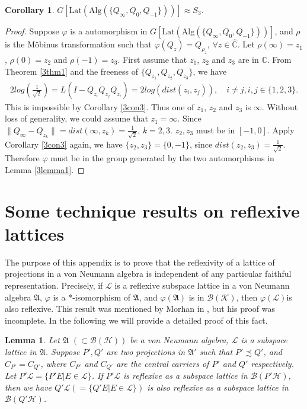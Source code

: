 \documentclass{amsart}
\newcommand{\AAA}{\mathfrak A}
\newcommand{\B}{\mathcal B}
\newcommand{\HHH}{\mathcal H} %
\newcommand{\KKK}{\mathcal K} %
\newcommand{\LLL}{\mathcal L} %
\newcommand{\Lat}{\mathrm{Lat}}
\newcommand{\Alg}{\mathrm{Alg}}
\newcommand{\C}{\mathbb C} %
\newtheorem{corollary}{Corollary}[section]
\newtheorem{lemma}{Lemma}[section]
\begin{document}
\begin{corollary}
$G[\Lat(\Alg( \{ Q_{\infty},  Q_{0}, Q_{-1} \}))] \approx S_3$.
\end{corollary}

\begin{proof}
Suppose $\varphi$ is a automorphism in $G[\Lat(\Alg( \{ Q_{\infty},  Q_{0}, Q_{-1} \}))]$, and $\rho$ is the M\"{o}binus transformation such that
$\varphi(Q_{z}) = Q_{\rho_{z}}$, $\forall z \in \widehat{\C}$. Let $\rho(\infty) = z_1$, $\rho(0) = z_2$ and $\rho(-1) = z_3$.
First assume that $z_1$, $z_2$ and $z_3$ are in $\C$. From Theorem \ref{3thm1} and the freeness of $\{Q_{z_1}, Q_{z_2}, Q_{z_3} \}$, we have 
\begin{align*}
2log(\frac{1}{\sqrt{2}}) =  L(I - Q_{z_i}Q_{z_j}Q_{z_i}) = 2log(dist(z_i, z_j)), \quad i \neq j, i, j \in \{1, 2, 3 \}.
\end{align*}
This is impossible by Corollary \ref{3con3}. Thus one of $z_1$, $z_2$ and $z_3$ is $\infty$. Without loss of generality, 
we could assume that $z_1 = \infty$. Since $\|Q_{\infty} - Q_{z_k} \| = dist(\infty , z_k) = \frac{1}{\sqrt{2}}$, $k = 2, 3$.
$z_2, z_3$ must be in $ [-1, 0]$. Apply Corollary \ref{3con3} again, we have $\{z_2, z_3\} = \{ 0, -1 \}$, since $dist(z_2,z_3) = \frac{1}{\sqrt{2}}$.  
Therefore $\varphi$ must be in the group generated by the two automorphisms in Lemma \ref{3lemma1}.
\end{proof}

\appendix
\section{Some technique results on reflexive lattices}
The purpose of this appendix is to prove that the reflexivity of a lattice of projections in a von Neumann algebra is 
independent of any particular faithful representation. Precisely, if $\LLL$ is a reflexive subspace lattice in a von Neumann algebra $\AAA$, 
$\varphi$ is a *-isomorphism of $\AAA$, and $\varphi(\AAA)$ is in $\B(\KKK)$, then $\varphi(\LLL)$is also reflexive.
This result was mentioned by Morhan in \cite{Mo}, but his proof was incomplete. In the following we will provide a detailed proof of this fact.

\begin{lemma}\label{alemma1}
Let $\AAA$ $(\subset \B(\HHH))$ be a von Neumann algebra, $\LLL$ is a
subspace lattice in $\AAA$. Suppose $P', Q'$ are two projections in $\AAA'$ such that $P' \precsim Q'$, and $C_{P'} = C_{Q'}$, where $C_{P'}$ and $C_{Q'}$ are the central carriers of $P'$ and $Q'$ respectively. Let $P'\LLL = \{P'E | E \in \LLL \}$. If $P'\LLL$ is reflexive as a subspace lattice in $\B(P' \HHH)$, then we have $Q'\LLL (=  \{Q'E | E \in \LLL \})$ is also reflexive as a subspace lattice in $\B(Q' \HHH)$.
\end{lemma}
\end{document}
